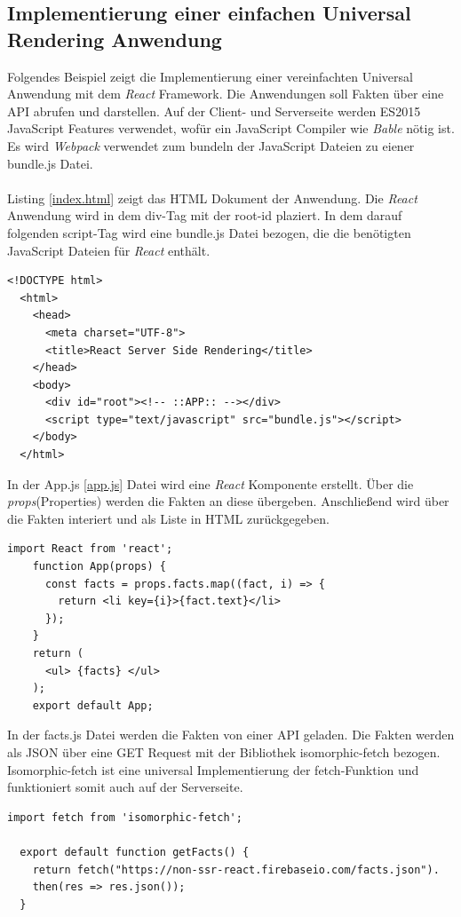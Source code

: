 \documentclass[runningheads]{llncs}
\numberwithin{figure}{section}
\begin{document}
\subsection{Implementierung einer einfachen Universal Rendering Anwendung}
\label{subsec:Implementierung einer einfachen Universal Rendering Anwendung}
Folgendes Beispiel zeigt die Implementierung einer vereinfachten Universal Anwendung mit dem 
\textit{React} Framework. Die Anwendungen soll Fakten über eine API abrufen und darstellen. 
Auf der Client- und Serverseite werden ES2015 JavaScript Features verwendet, 
wofür ein JavaScript Compiler wie \textit{Bable} nötig ist. Es wird \textit{Webpack} verwendet
zum bundeln der JavaScript Dateien zu eiener bundle.js Datei.
\\
\\
Listing \ref{index.html} zeigt das HTML Dokument der Anwendung. 
Die \textit{React} Anwendung wird in dem div-Tag mit der root-id plaziert.
In dem darauf folgenden script-Tag wird eine bundle.js Datei bezogen, die die benötigten
JavaScript Dateien für \textit{React} enthält.
\begin{lstlisting}[style=ES6, caption={index.html},label=index.html]
  <!DOCTYPE html>
  <html>
    <head>
      <meta charset="UTF-8">
      <title>React Server Side Rendering</title>
    </head>
    <body>
      <div id="root"><!-- ::APP:: --></div>
      <script type="text/javascript" src="bundle.js"></script>
    </body>
  </html>
\end{lstlisting}
In der App.js \ref{app.js} Datei wird eine \textit{React} Komponente erstellt. Über die \textit{props}(Properties)
werden die Fakten an diese übergeben. Anschließend wird über die Fakten interiert und 
als Liste in HTML zurückgegeben.
\begin{lstlisting}[style=ES6, caption={App.js}, label=app.js]
  import React from 'react';  
    function App(props) {
      const facts = props.facts.map((fact, i) => {
        return <li key={i}>{fact.text}</li>
      });
    }
    return (
      <ul> {facts} </ul>
    );
    export default App;
\end{lstlisting}
\newpage
\noindent
In der facts.js Datei werden die Fakten von einer API geladen.
Die Fakten werden als JSON über eine GET Request mit der Bibliothek isomorphic-fetch bezogen.
Isomorphic-fetch ist eine universal Implementierung der fetch-Funktion und funktioniert somit auch
auf der Serverseite.
\begin{lstlisting}[style=ES6, caption={facts.js}]
  import fetch from 'isomorphic-fetch';
  
  export default function getFacts() {
    return fetch("https://non-ssr-react.firebaseio.com/facts.json").
    then(res => res.json());
  }
\end{lstlisting}
\end{document}
